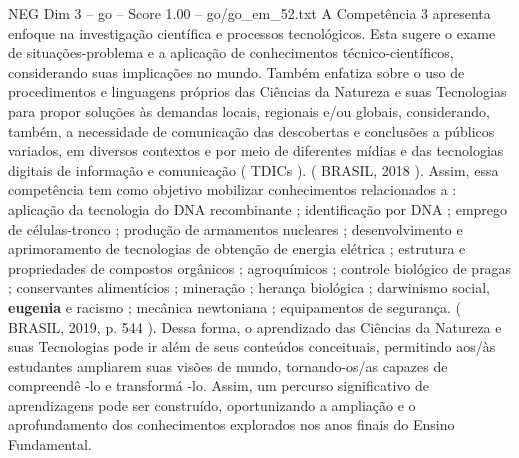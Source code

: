 \begin{textsample}{NEG Dim 3 – go – Score 1.00 – go/go\_em\_52.txt}
A Competência 3 apresenta enfoque na investigação científica e processos tecnológicos.
Esta sugere o exame de situações-problema e a aplicação de conhecimentos técnico-científicos, considerando suas implicações no mundo.
Também enfatiza sobre o uso de procedimentos e linguagens próprios das Ciências da Natureza e suas Tecnologias para propor soluções às demandas locais, regionais e/ou globais, considerando, também, a necessidade de comunicação das descobertas e conclusões a públicos variados, em diversos contextos e por meio de diferentes mídias e das tecnologias digitais de informação e comunicação ( TDICs ). ( BRASIL, 2018 ).
Assim, essa competência tem como objetivo mobilizar conhecimentos relacionados a : aplicação da tecnologia do DNA recombinante ; identificação por DNA ; emprego de células-tronco ; produção de armamentos nucleares ; desenvolvimento e aprimoramento de tecnologias de obtenção de energia elétrica ; estrutura e propriedades de compostos orgânicos ; agroquímicos ; controle biológico de pragas ; conservantes alimentícios ; mineração ; herança biológica ; darwinismo social, \textbf{eugenia} e racismo ; mecânica newtoniana ; equipamentos de segurança. ( BRASIL, 2019, p. 544 ).
Dessa forma, o aprendizado das Ciências da Natureza e suas Tecnologias pode ir além de seus conteúdos conceituais, permitindo aos/às estudantes ampliarem suas visões de mundo, tornando-os/as capazes de compreendê -lo e transformá -lo.
Assim, um percurso significativo de aprendizagens pode ser construído, oportunizando a ampliação e o aprofundamento dos conhecimentos explorados nos anos finais do Ensino Fundamental.

\end{textsample}
